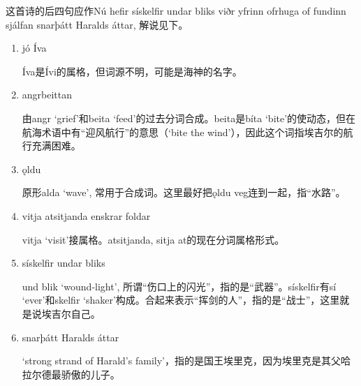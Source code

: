 \begin{grammar*}{}
    这首诗的后四句应作Nú hefir sískelfir undar bliks viðr yfrinn ofrhuga of fundinn sjálfan
    snarþátt Haralds áttar, 解说见下。
    \begin{enumerate}[leftmargin=*]
        \item jó Íva

              Íva是Ívi的属格，但词源不明，可能是海神的名字。

        \item angrbeittan

              由angr `grief'和beita `feed'的过去分词合成。beita是bíta `bite'的使动态，但在航海术语中有“迎风航行”的意思（`bite the wind'），因此这个词指埃吉尔的航行充满困难。

        \item ǫldu

              原形alda `wave', 常用于合成词。这里最好把ǫldu veg连到一起，指“水路”。
        \item vitja atsitjanda enskrar foldar

              vitja `visit'接属格。atsitjanda, sitja at的现在分词属格形式。
        \item sískelfir undar bliks

              und blik `wound-light', 所谓“伤口上的闪光”，指的是“武器”。sískelfir有sí `ever'和skelfir `shaker'构成。合起来表示“挥剑的人”，指的是“战士”，这里就是说埃吉尔自己。

        \item snarþátt Haralds áttar

              `strong strand of Harald's family'，指的是国王埃里克，因为埃里克是其父哈拉尔德最骄傲的儿子。

    \end{enumerate}
\end{grammar*}

